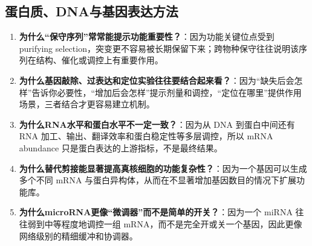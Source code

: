 \documentclass[12pt,fontset=none]{ctexart}
\begin{document}
\subsection*{蛋白质、DNA与基因表达方法}
\begin{enumerate}
\item \textbf{为什么“保守序列”常常能提示功能重要性？}：因为功能关键位点受到 purifying selection，突变更不容易被长期保留下来；跨物种保守往往说明该序列在结构、催化或调控上有重要作用。

\item \textbf{为什么基因敲除、过表达和定位实验往往要结合起来看？}：因为“缺失后会怎样”告诉你必要性，“增加后会怎样”提示剂量和调控，“定位在哪里”提供作用场景，三者结合才更容易建立机制。

\item \textbf{为什么RNA水平和蛋白水平不一定一致？}：因为从 DNA 到蛋白中间还有 RNA 加工、输出、翻译效率和蛋白稳定性等多层调控，所以 mRNA abundance 只是蛋白表达的上游指标，不是最终结果。

\item \textbf{为什么替代剪接能显著提高真核细胞的功能复杂性？}：因为一个基因可以生成多个不同 mRNA 与蛋白异构体，从而在不显著增加基因数目的情况下扩展功能库。

\item \textbf{为什么microRNA更像“微调器”而不是简单的开关？}：因为一个 miRNA 往往弱到中等程度地调控一组 mRNA，而不是完全开或关一个基因，因此更像网络级别的精细缓冲和协调器。
\end{enumerate}

\end{document}
